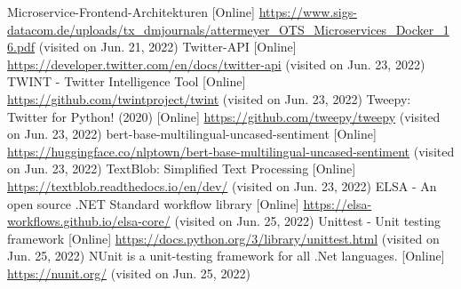 \documentclass[conference]{IEEEtran}
\begin{document}
\begin{thebibliography}{0}
    Microservice-Frontend-Architekturen [Online] \url{https://www.sigs-datacom.de/uploads/tx_dmjournals/attermeyer_OTS_Microservices_Docker_16.pdf} (visited on Jun. 21, 2022)
    Twitter-API [Online] \url{https://developer.twitter.com/en/docs/twitter-api} (visited on Jun. 23, 2022)
    TWINT - Twitter Intelligence Tool [Online] \url{https://github.com/twintproject/twint} (visited on Jun. 23, 2022)
    Tweepy: Twitter for Python! (2020) [Online] \url{https://github.com/tweepy/tweepy} (visited on Jun. 23, 2022)
    bert-base-multilingual-uncased-sentiment [Online] \url{https://huggingface.co/nlptown/bert-base-multilingual-uncased-sentiment} (visited on Jun. 23, 2022)
    TextBlob: Simplified Text Processing [Online] \url{https://textblob.readthedocs.io/en/dev/} (visited on Jun. 23, 2022)
    ELSA - An open source .NET Standard workflow library [Online] \url{https://elsa-workflows.github.io/elsa-core/} (visited on Jun. 25, 2022)
    Unittest - Unit testing framework [Online] \url{https://docs.python.org/3/library/unittest.html} (visited on Jun. 25, 2022)
    NUnit is a unit-testing framework for all .Net languages. [Online] \url{https://nunit.org/} (visited on Jun. 25, 2022)

    
\end{thebibliography}
\end{document}
